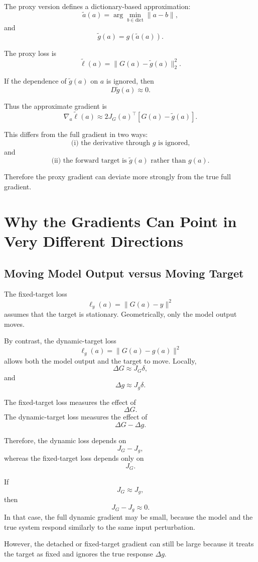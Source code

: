 \documentclass{article}
\begin{document}
The proxy version defines a dictionary-based approximation:
\[
    \tilde a(a)
    =
    \arg\min_{b\in \mathrm{dict}}\|a-b\|,
\]
and
\[
    \tilde g(a)=g(\tilde a(a)).
\]

The proxy loss is
\[
    \tilde \ell(a)
    =
    \|G(a)-\tilde g(a)\|_2^2.
\]

If the dependence of \(\tilde g(a)\) on \(a\) is ignored, then
\[
    D\tilde g(a)\approx 0.
\]

Thus the approximate gradient is
\[
    \boxed{
    \nabla_a \tilde \ell(a)
    \approx
    2J_G(a)^\top [G(a)-\tilde g(a)]
    }.
\]

This differs from the full gradient in two ways:
\[
    \text{(i) the derivative through }g\text{ is ignored,}
\]
and
\[
    \text{(ii) the forward target is } \tilde g(a) \text{ rather than } g(a).
\]

Therefore the proxy gradient can deviate more strongly from the true full gradient.

\section{Why the Gradients Can Point in Very Different Directions}

\subsection{Moving Model Output versus Moving Target}

The fixed-target loss
\[
    \ell_y(a)=\|G(a)-y\|^2
\]
assumes that the target is stationary. Geometrically, only the model output moves.

By contrast, the dynamic-target loss
\[
    \ell_g(a)=\|G(a)-g(a)\|^2
\]
allows both the model output and the target to move. Locally,
\[
    \Delta G \approx J_G\delta,
\]
and
\[
    \Delta g \approx J_g\delta.
\]

The fixed-target loss measures the effect of
\[
    \Delta G.
\]
The dynamic-target loss measures the effect of
\[
    \Delta G-\Delta g.
\]

Therefore, the dynamic loss depends on
\[
    J_G-J_g,
\]
whereas the fixed-target loss depends only on
\[
    J_G.
\]

If
\[
    J_G\approx J_g,
\]
then
\[
    J_G-J_g\approx 0.
\]
In that case, the full dynamic gradient may be small, because the model and the true system respond similarly to the same input perturbation.

However, the detached or fixed-target gradient can still be large because it treats the target as fixed and ignores the true response \(\Delta g\).
\end{document}
